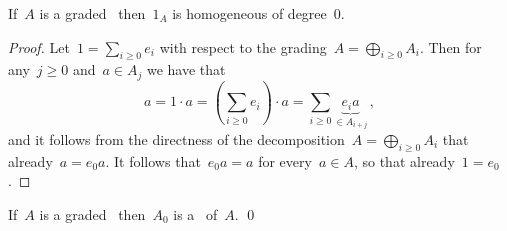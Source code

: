 \begin{lemma}
  If~$A$ is a graded~\algebra{$\kf$} then~$1_A$ is homogeneous of degree~$0$.
\end{lemma}


\begin{proof}
  Let~$1 = \sum_{i \geq 0} e_i$ with respect to the grading~$A = \bigoplus_{i \geq 0} A_i$.
  Then for any~$j \geq 0$ and~$a \in A_j$ we have that
  \[
    a
    =
    1 \cdot a
    =
    \left( \sum_{i \geq 0} e_i \right) \cdot a
    =
    \sum_{i \geq 0} \underbrace{ e_i a }_{\in A_{i+j}}  \,,
  \]
  and it follows from the directness of the decomposition~$A = \bigoplus_{i \geq 0} A_i$ that already~$a = e_0 a$.
  It follows that~$e_0 a = a$ for every~$a \in A$, so that already~$1 = e_0$.
\end{proof}


\begin{corollary}
  If~$A$ is a graded~\algebra{$\kf$} then~$A_0$ is a~{\subalgebra{$\kf$}} of~$A$.
  \qed
\end{corollary}



